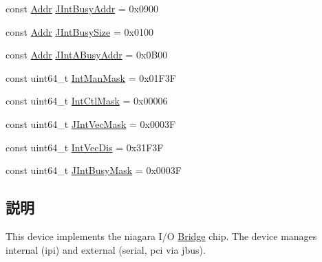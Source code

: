 \begin{DoxyCompactItemize}
const \hyperlink{base_2types_8hh_af1bb03d6a4ee096394a6749f0a169232}{Addr} \hyperlink{iob_8hh_ac72e83848f2a94647997f7f15a481193}{JIntBusyAddr} = 0x0900
\item 
const \hyperlink{base_2types_8hh_af1bb03d6a4ee096394a6749f0a169232}{Addr} \hyperlink{iob_8hh_a9395c439491c78383ddc5bf6a6a444be}{JIntBusySize} = 0x0100
\item 
const \hyperlink{base_2types_8hh_af1bb03d6a4ee096394a6749f0a169232}{Addr} \hyperlink{iob_8hh_a026c3e790ce0ad35bf570cd7d753b0b1}{JIntABusyAddr} = 0x0B00
\item 
const uint64\_\-t \hyperlink{iob_8hh_ac172e68b1100862061270a74ce63a527}{IntManMask} = 0x01F3F
\item 
const uint64\_\-t \hyperlink{iob_8hh_a9ebd85074fdd9cc9a5a6079c0a218822}{IntCtlMask} = 0x00006
\item 
const uint64\_\-t \hyperlink{iob_8hh_a53d7e5bac6971d132eb0dcb0efb3b271}{JIntVecMask} = 0x0003F
\item 
const uint64\_\-t \hyperlink{iob_8hh_aa8ed1e2f011322bfc744ae7cd511ba5d}{IntVecDis} = 0x31F3F
\item 
const uint64\_\-t \hyperlink{iob_8hh_a85c502f9e09ac6ac8295ba12e4149a45}{JIntBusyMask} = 0x0003F
\end{DoxyCompactItemize}


\subsection{説明}
This device implements the niagara I/O \hyperlink{classBridge}{Bridge} chip. The device manages internal (ipi) and external (serial, pci via jbus). 

